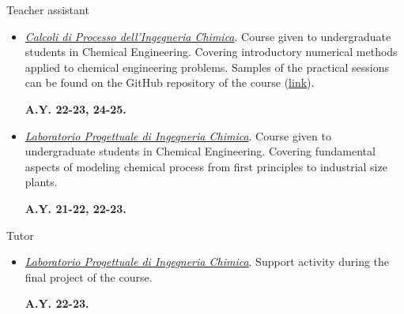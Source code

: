 \begin{position_simple}{Teacher assistant}{\polimi}
    \begin{itemize}
        \item[ ]
              \begin{minipage}[t]{0.75\textwidth}
                  \ul{\it Calcoli di Processo dell'Ingegneria Chimica}. Course given to
                  undergraduate students in Chemical Engineering. Covering introductory numerical
                  methods applied to chemical engineering problems. Samples of the practical sessions
                  can be found on the GitHub repository of the course
                  (\href{https://github.com/Titodinelli/Calcoli-di-Processo-dell-Ingegneria-Chimica}{link}).
              \end{minipage}
              \begin{minipage}[t]{0.18\textwidth}
                  \begin{flushright}
                      \bfseries A.Y. 22-23, 24-25.
                  \end{flushright}
              \end{minipage}

        \item[ ]
              \begin{minipage}[t]{0.75\textwidth}
                  \ul{\it Laboratorio Progettuale di Ingegneria Chimica}. Course given to
                  undergraduate students in Chemical Engineering. Covering fundamental aspects of
                  modeling chemical process from first principles to industrial size plants.
              \end{minipage}
              \begin{minipage}[t]{0.18\textwidth}
                  \begin{flushright}
                      \bfseries A.Y. 21-22, 22-23.
                  \end{flushright}
              \end{minipage}
    \end{itemize}
\end{position_simple}

\begin{position_simple}{Tutor}{\polimi}
    \begin{itemize}
        \item[ ]
              \begin{minipage}[t]{0.75\textwidth}
                  \ul{\it Laboratorio Progettuale di Ingegneria Chimica}. Support activity during
                  the final project of the course.
              \end{minipage}
              \begin{minipage}[t]{0.18\textwidth}
                  \begin{flushright}
                      \bfseries A.Y. 22-23.
                  \end{flushright}
              \end{minipage}
    \end{itemize}
\end{position_simple}
